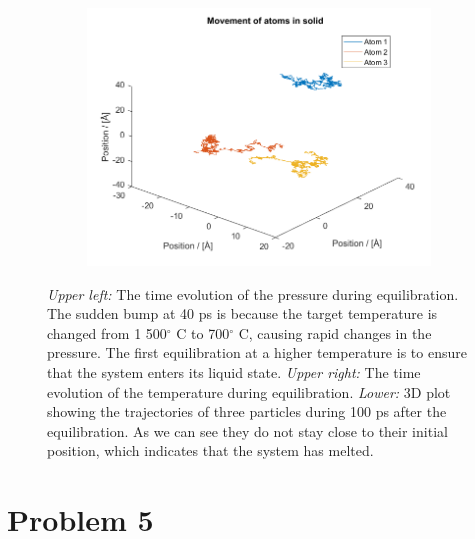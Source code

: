 \begin{figure}[H]
\begin{subfigure}[b]{0.40\textwidth}
    \end{subfigure}
    \begin{subfigure}[b]{0.40\textwidth}
        \centering
        \includegraphics[width=\textwidth]{graphics/task4/traj.png}
    \end{subfigure}
    \caption{\textit{Upper left:} The time evolution of the pressure during equilibration. The sudden bump at 40 ps is because the target temperature is changed from 1 500$^\circ$ C to 700$^\circ$ C, causing rapid changes in the pressure. The first equilibration at a higher temperature is to ensure that the system enters its liquid state. \textit{Upper right:} The time evolution of the temperature during equilibration. \textit{Lower:} 3D plot showing the trajectories of three particles during 100 ps after the equilibration. As we can see they do not stay close to their initial position, which indicates that the system has melted.}
    \label{fig:equilibrium700}
\end{figure}


\section*{Problem 5}

